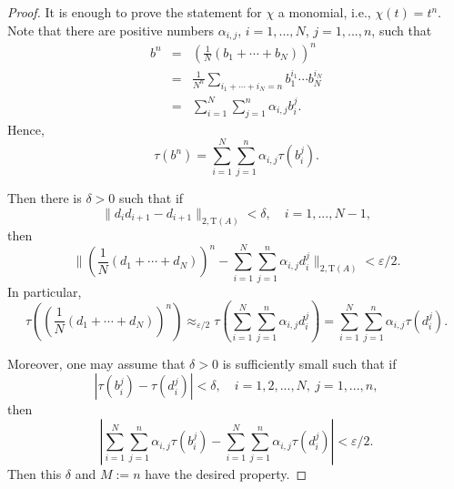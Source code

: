 \documentclass[12pt, oneside, psamsfonts]{amsart}
\theoremstyle{definition}
\theoremstyle{remark}
\numberwithin{equation}{section}
\newcommand{\norm}[1]{\| #1\|}
\newcommand{\abs}[1]{| #1 |}
\newcommand{\eps}{\varepsilon}
\newcommand{\tr}{\mathrm{T}}
\begin{document}
\begin{proof}
It is enough to prove the statement for $\chi$ a monomial, i.e., $\chi(t) = t^n$. Note that there are positive numbers $\alpha_{i, j}$, $i=1, ..., N$, $j=1, ..., n$, such that
\begin{eqnarray*}
b^n & = & (\frac{1}{N}(b_1 + \cdots + b_N))^n \\
& = & \frac{1}{N^n}\sum_{i_1+\cdots + i_N = n} b_1^{i_1}\cdots b_N^{i_N} \\
& = & \sum_{i=1}^N \sum_{j=1}^n \alpha_{i, j} b_i^j.
\end{eqnarray*}
Hence,
$$\tau(b^n) = \sum_{i=1}^N \sum_{j=1}^n \alpha_{i, j} \tau(b_i^j).$$

Then there is $\delta>0$ such that if $$ \norm{d_id_{i+1} - d_{i+1}}_{2, \tr(A)} < \delta,\quad i=1, ..., N-1,$$ then
$$ \norm{ (\frac{1}{N}(d_1 + \cdots + d_N))^n - \sum_{i=1}^N \sum_{j=1}^n \alpha_{i, j} d_i^j }_{2, \tr(A)} < \eps/2.$$ 
In particular,
$$\tau((\frac{1}{N}(d_1+\cdots + d_N))^n) \approx_{\eps/2} \tau( \sum_{i=1}^N \sum_{j=1}^n \alpha_{i, j} d_i^j) = \sum_{i=1}^N \sum_{j=1}^n \alpha_{i, j} \tau(d_i^j). $$

Moreover, one may assume that $\delta>0$ is sufficiently small such that if 
$$\abs{\tau(b_i^j) - \tau(d_i^j)} < \delta,\quad i=1, 2, ..., N,\ j=1, ..., n,$$
then
$$ \abs{ \sum_{i=1}^N \sum_{j=1}^n \alpha_{i, j} \tau(b_i^j) - \sum_{i=1}^N \sum_{j=1}^n \alpha_{i, j} \tau(d_i^j) } < \eps/2.$$
Then this $\delta$ and $M:=n$ have the desired property.
\end{proof}
\end{document}
